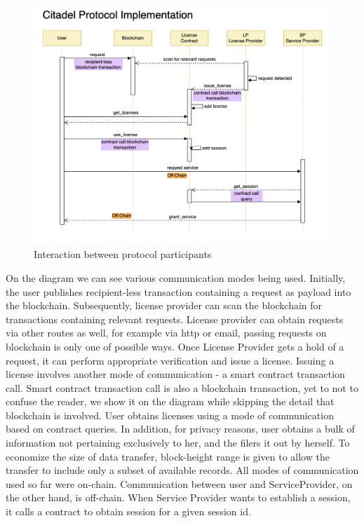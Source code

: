 \begin{figure}[h]
	\centering
		\includegraphics[width=390pt,draft=false]{images/implementation.png}
	\caption{Interaction between protocol participants}
	\label{fig:implementation}
\end{figure}

\begin{flushleft}
On the diagram we can see various communication modes being used. Initially, the user publishes recipient-less transaction containing a request as payload into the blockchain. Subsequently, license provider can scan the blockchain for transactions containing relevant requests. License provider can obtain requests via other routes as well, for example via http or email, passing requests on blockchain is only one of possible ways. Once License Provider gets a hold of a request, it can perform appropriate verification and issue a license. Issuing a license involves another mode of communication - a smart contract transaction call. Smart contract transaction call is also a blockchain transaction, yet to not to confuse the reader, we show it on the diagram while skipping the detail that blockchain is involved. User obtains licenses using a mode of communication based on contract queries. In addition, for privacy reasons, user obtains a bulk of information not pertaining exclusively to her, and the filers it out by herself. To economize the size of data transfer, block-height range is given to allow the transfer to include only a subset of available records. All modes of communication used so far were on-chain. Communication between user and ServiceProvider, on the other hand, is off-chain. When Service Provider wants to establish a session, it calls a contract to obtain session for a given session id.
\end{flushleft}

